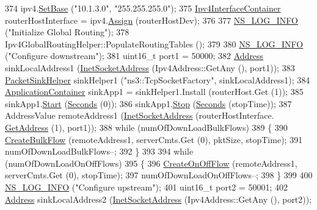 \begin{DoxyCode}
374   ipv4.\hyperlink{classns3_1_1Ipv4AddressHelper_acf7b16dd25bac67e00f5e25f90a9a035}{SetBase} (\textcolor{stringliteral}{"10.1.3.0"}, \textcolor{stringliteral}{"255.255.255.0"});
375   \hyperlink{classns3_1_1Ipv4InterfaceContainer}{Ipv4InterfaceContainer} routerHostInterface = ipv4.\hyperlink{classns3_1_1Ipv4AddressHelper_af8e7f4a1a7e74c00014a1eac445a27af}{Assign} (routerHostDev);
376 
377   \hyperlink{group__logging_gafbd73ee2cf9f26b319f49086d8e860fb}{NS\_LOG\_INFO} (\textcolor{stringliteral}{"Initialize Global Routing"});
378   Ipv4GlobalRoutingHelper::PopulateRoutingTables ();
379 
380   \hyperlink{group__logging_gafbd73ee2cf9f26b319f49086d8e860fb}{NS\_LOG\_INFO} (\textcolor{stringliteral}{"Configure downstream"});
381   uint16\_t port1 = 50000;
382   \hyperlink{classns3_1_1Address}{Address} sinkLocalAddress1 (\hyperlink{classns3_1_1InetSocketAddress}{InetSocketAddress} (Ipv4Address::GetAny (), port1));
383   \hyperlink{classns3_1_1PacketSinkHelper}{PacketSinkHelper} sinkHelper1 (\textcolor{stringliteral}{"ns3::TcpSocketFactory"}, sinkLocalAddress1);
384   \hyperlink{classns3_1_1ApplicationContainer}{ApplicationContainer} sinkApp1 = sinkHelper1.Install (routerHost.Get (1));
385   sinkApp1.\hyperlink{classns3_1_1ApplicationContainer_a8eff87926507020bbe3e1390358a54a7}{Start} (\hyperlink{group__timecivil_ga33c34b816f8ff6628e33d5c8e9713b9e}{Seconds} (0));
386   sinkApp1.\hyperlink{classns3_1_1ApplicationContainer_adfc52f9aa4020c8714679b00bbb9ddb3}{Stop} (\hyperlink{group__timecivil_ga33c34b816f8ff6628e33d5c8e9713b9e}{Seconds} (stopTime));
387   AddressValue remoteAddress1 (\hyperlink{classns3_1_1InetSocketAddress}{InetSocketAddress} (routerHostInterface.
      \hyperlink{classns3_1_1Ipv4InterfaceContainer_ae63208dcd222be986822937ee4aa828c}{GetAddress} (1), port1));
388   \textcolor{keywordflow}{while} (numOfDownLoadBulkFlows)
389     \{
390       \hyperlink{codel-vs-pfifo-asymmetric_8cc_a4d992db17e839d6d89204a95be422763}{CreateBulkFlow} (remoteAddress1, serverCmts.Get (0), pktSize, stopTime);
391       numOfDownLoadBulkFlows--;
392     \}
393 
394   \textcolor{keywordflow}{while} (numOfDownLoadOnOffFlows)
395     \{
396       \hyperlink{codel-vs-pfifo-asymmetric_8cc_aa3d189125687c5d379924c22326d45eb}{CreateOnOffFlow} (remoteAddress1, serverCmts.Get (0), stopTime);
397       numOfDownLoadOnOffFlows--;
398     \}
399 
400   \hyperlink{group__logging_gafbd73ee2cf9f26b319f49086d8e860fb}{NS\_LOG\_INFO} (\textcolor{stringliteral}{"Configure upstream"});
401   uint16\_t port2 = 50001;
402   \hyperlink{classns3_1_1Address}{Address} sinkLocalAddress2 (\hyperlink{classns3_1_1InetSocketAddress}{InetSocketAddress} (Ipv4Address::GetAny (), port2));

\end{DoxyCode}

